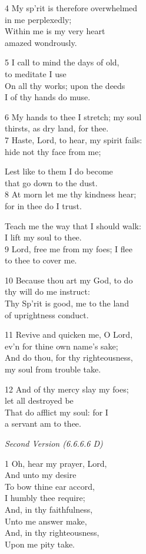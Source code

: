 4 My sp’rit is therefore overwhelmed\\
in me perplexedly;\\
Within me is my very heart\\
amazed wondrously.

5 I call to mind the days of old,\\
to meditate I use\\
On all thy works; upon the deeds\\
I of thy hands do muse.

6 My hands to thee I stretch; my soul\\
thirsts, as dry land, for thee.\\
7 Haste, Lord, to hear, my spirit fails:\\
hide not thy face from me;

Lest like to them I do become\\
that go down to the dust.\\
8 At morn let me thy kindness hear;\\
for in thee do I trust.

Teach me the way that I should walk:\\
I lift my soul to thee.\\
9 Lord, free me from my foes; I flee\\
to thee to cover me.

10 Because thou art my God, to do\\
thy will do me instruct:\\
Thy Sp’rit is good, me to the land\\
of uprightness conduct.

11 Revive and quicken me, O Lord,\\
ev’n for thine own name’s sake;\\
And do thou, for thy righteousness,\\
my soul from trouble take.

12 And of thy mercy slay my foes;\\
let all destroyed be\\
That do afflict my soul: for I\\
a servant am to thee.

\emph{Second Version (6.6.6.6 D)}

1 Oh, hear my prayer, Lord,\\
And unto my desire\\
To bow thine ear accord,\\
I humbly thee require;\\
And, in thy faithfulness,\\
Unto me answer make,\\
And, in thy righteousness,\\
Upon me pity take.

